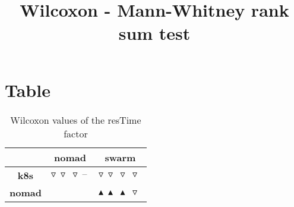\documentclass{article}
\title{Wilcoxon - Mann-Whitney rank sum test}
\author{}
\begin{document}
\maketitle
\section{Table}
\begin{table}[!htp]
  \caption{Wilcoxon values of the resTime factor}
  \label{table:resTime}
  \centering
  \begin{scriptsize}
  \begin{tabular}{c|cc}
      & \textbf{nomad} & \textbf{swarm} \\\hline
      \textbf{k8s} & $\triangledown\ \triangledown\ \triangledown\ \text{--}\  $ & $ \triangledown\ \triangledown\ \triangledown\ \triangledown\ $ \\
      \textbf{nomad} & $ $ & $ \blacktriangle\ \blacktriangle\ \blacktriangle\ \triangledown\ $ \\
  \end{tabular}
  \end{scriptsize}
\end{table}
\end{document}

